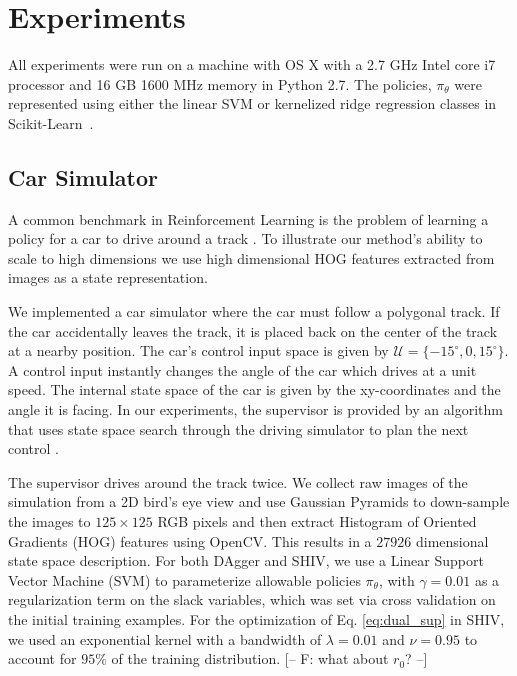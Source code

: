 \documentclass[10pt, conference]{ieeeconf}      %
\newcommand{\acro}{SHIV}
\begin{document}


\section{Experiments}
All experiments were run on a machine with OS X with a 2.7 GHz Intel core i7 processor and 16 GB
1600 MHz memory in Python 2.7. The policies, $\pi_\theta$ were represented using either the linear SVM or  kernelized ridge regression classes in Scikit-Learn~\cite{scikit-learn}.

\subsection{Car Simulator}
A common benchmark in Reinforcement Learning is the problem of learning a policy for a car to drive around a track
\cite{argall2009survey}. To illustrate our method's ability to scale to high dimensions we use high dimensional HOG features extracted from images
as a state representation. 

We implemented a car simulator where the car must follow a polygonal track. If the car accidentally leaves the track, it is placed
back on the center of the track at a nearby position. The car's control input space is given by  $\mathcal{U} = \lbrace
-15^\circ, 0, 15^\circ \rbrace$. A control input instantly changes the angle of the car which drives at a unit speed. 
The internal state space of the car is given by the
xy-coordinates and the angle it is facing. In our experiments, the supervisor is provided by an algorithm that uses
state space search through the driving simulator to plan the next control .

The supervisor drives around the track twice. We collect raw images of the simulation from a 2D bird's eye view
and use Gaussian Pyramids to down-sample the images to $125 \times 125$ RGB pixels and then extract Histogram of
Oriented Gradients (HOG) features using OpenCV. This results in a $27926$ dimensional state space description.
For both DAgger and \acro, we use a Linear Support Vector Machine (SVM) to parameterize allowable
policies $\pi_{\theta}$, with $\gamma=0.01$ as a regularization term on the slack variables, which was set via cross
validation on the initial training examples. For the optimization of Eq. \ref{eq:dual_sup} in \acro, we used an
exponential kernel with a bandwidth of $\lambda=0.01$ and $\nu = 0.95$ to account for $95\%$ of the training distribution. 
{\color{blue} [-- F: what about $r_0$? --]}
\end{document}
